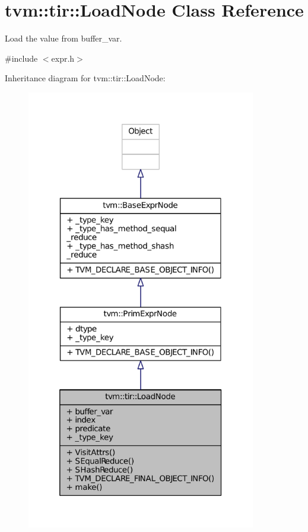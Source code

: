 \hypertarget{classtvm_1_1tir_1_1LoadNode}{}\section{tvm\+:\+:tir\+:\+:Load\+Node Class Reference}
\label{classtvm_1_1tir_1_1LoadNode}


Load the value from buffer\+\_\+var.  




{\ttfamily \#include $<$expr.\+h$>$}



Inheritance diagram for tvm\+:\+:tir\+:\+:Load\+Node\+:
\nopagebreak
\begin{figure}[H]
\begin{center}
\leavevmode
\includegraphics[height=550pt]{classtvm_1_1tir_1_1LoadNode__inherit__graph}
\end{center}
\end{figure}


